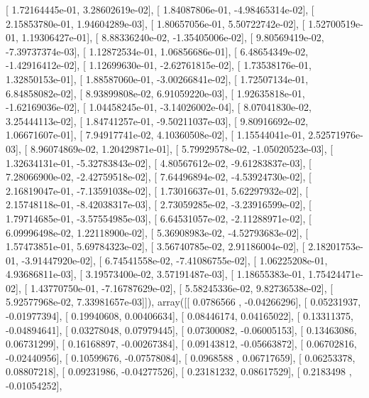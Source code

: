 \documentclass{article}
\begin{document}
       [  1.72164445e-01,   3.28602619e-02],
       [  1.84087806e-01,  -4.98465314e-02],
       [  2.15853780e-01,   1.94604289e-03],
       [  1.80657056e-01,   5.50722742e-02],
       [  1.52700519e-01,   1.19306427e-01],
       [  8.88336240e-02,  -1.35405006e-02],
       [  9.80569419e-02,  -7.39737374e-03],
       [  1.12872534e-01,   1.06856686e-01],
       [  6.48654349e-02,  -1.42916412e-02],
       [  1.12699630e-01,  -2.62761815e-02],
       [  1.73538176e-01,   1.32850153e-01],
       [  1.88587060e-01,  -3.00266841e-02],
       [  1.72507134e-01,   6.84858082e-02],
       [  8.93899808e-02,   6.91059220e-03],
       [  1.92635818e-01,  -1.62169036e-02],
       [  1.04458245e-01,  -3.14026002e-04],
       [  8.07041830e-02,   3.25444113e-02],
       [  1.84741257e-01,  -9.50211037e-03],
       [  9.80916692e-02,   1.06671607e-01],
       [  7.94917741e-02,   4.10360508e-02],
       [  1.15544041e-01,   2.52571976e-03],
       [  8.96074869e-02,   1.20429871e-01],
       [  5.79929578e-02,  -1.05020523e-03],
       [  1.32634131e-01,  -5.32783843e-02],
       [  4.80567612e-02,  -9.61283837e-03],
       [  7.28066900e-02,  -2.42759518e-02],
       [  7.64496894e-02,  -4.53924730e-02],
       [  2.16819047e-01,  -7.13591038e-02],
       [  1.73016637e-01,   5.62297932e-02],
       [  2.15748118e-01,  -8.42038317e-03],
       [  2.73059285e-02,  -3.23916599e-02],
       [  1.79714685e-01,  -3.57554985e-03],
       [  6.64531057e-02,  -2.11288971e-02],
       [  6.09996498e-02,   1.22118900e-02],
       [  5.36908983e-02,  -4.52793683e-02],
       [  1.57473851e-01,   5.69784323e-02],
       [  3.56740785e-02,   2.91186004e-02],
       [  2.18201753e-01,  -3.91447920e-02],
       [  6.74541558e-02,  -7.41086755e-02],
       [  1.06225208e-01,   4.93686811e-03],
       [  3.19573400e-02,   3.57191487e-03],
       [  1.18655383e-01,   1.75424471e-02],
       [  1.43770750e-01,  -7.16787629e-02],
       [  5.58245336e-02,   9.82736538e-02],
       [  5.92577968e-02,   7.33981657e-03]]), array([[ 0.0786566 , -0.04266296],
       [ 0.05231937, -0.01977394],
       [ 0.19940608,  0.00406634],
       [ 0.08446174,  0.04165022],
       [ 0.13311375, -0.04894641],
       [ 0.03278048,  0.07979445],
       [ 0.07300082, -0.06005153],
       [ 0.13463086,  0.06731299],
       [ 0.16168897, -0.00267384],
       [ 0.09143812, -0.05663872],
       [ 0.06702816, -0.02440956],
       [ 0.10599676, -0.07578084],
       [ 0.0968588 ,  0.06717659],
       [ 0.06253378,  0.08807218],
       [ 0.09231986, -0.04277526],
       [ 0.23181232,  0.08617529],
       [ 0.2183498 , -0.01054252],
\end{document}
